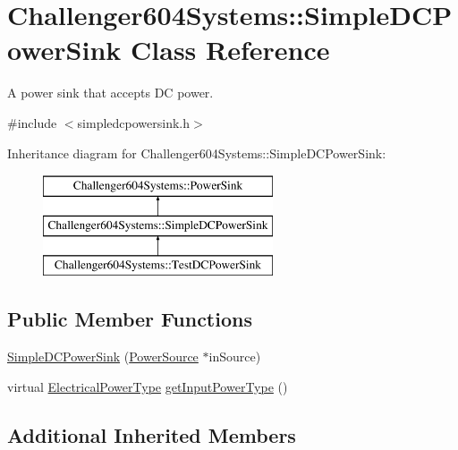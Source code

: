 \hypertarget{class_challenger604_systems_1_1_simple_d_c_power_sink}{\section{Challenger604\-Systems\-:\-:Simple\-D\-C\-Power\-Sink Class Reference}
\label{class_challenger604_systems_1_1_simple_d_c_power_sink}
}


A power sink that accepts D\-C power.  




{\ttfamily \#include $<$simpledcpowersink.\-h$>$}

Inheritance diagram for Challenger604\-Systems\-:\-:Simple\-D\-C\-Power\-Sink\-:\begin{figure}[H]
\begin{center}
\leavevmode
\includegraphics[height=3.000000cm]{class_challenger604_systems_1_1_simple_d_c_power_sink}
\end{center}
\end{figure}
\subsection*{Public Member Functions}
\begin{DoxyCompactItemize}
\item 
\hyperlink{class_challenger604_systems_1_1_simple_d_c_power_sink_a8c3c6593b021998352f97b596963e5e3}{Simple\-D\-C\-Power\-Sink} (\hyperlink{class_challenger604_systems_1_1_power_source}{Power\-Source} $\ast$in\-Source)
\item 
virtual \hyperlink{namespace_challenger604_systems_a9ad1a793d94b97514092692cb7315afd}{Electrical\-Power\-Type} \hyperlink{class_challenger604_systems_1_1_simple_d_c_power_sink_aa487ad5aaa41a206dac34aca02622af9}{get\-Input\-Power\-Type} ()
\end{DoxyCompactItemize}
\subsection*{Additional Inherited Members}


